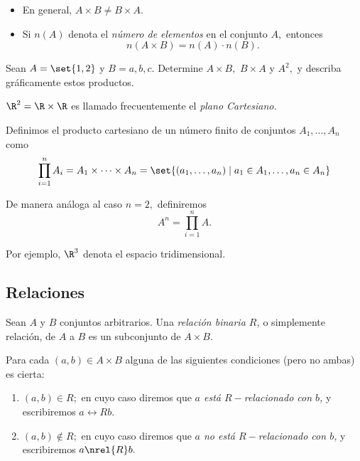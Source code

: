 	\begin{observacion}
		\begin{itemize}
			\item En general, $A\times B \neq B \times A.$
			\item Si \emph{$n(A)$} denota el \emph{número de elementos} en el conjunto $A,$ entonces
			$$
			n(A \times B)= n(A) \cdot n(B).
			$$
		\end{itemize}

	\end{observacion}





	Sean $A=\set{1,2}$ y $B={a,b,c}.$ Determine $A\times B,$ $B\times A$ y $A^{2},$ y describa gráficamente estos productos.



	\begin{problema}
		$\R^{2}=\R \times \R$ es llamado frecuentemente el \emph{plano Cartesiano.}
	\end{problema}




	\begin{definicion}
		Definimos el producto cartesiano de un número finito de conjuntos $A_{1},...,A_{n}$ como
		$$
		\prod_{i=1}^{n} A_{i}= A_{1} \times \cdots \times A_{n}=\set{\left( a_{1},\dots,a_{n} \right)\mid a_{1}\in A_{1}, \dots, a_{n}\in A_{n}}
		$$
	\end{definicion}




	\begin{observacion}
		De manera análoga al caso $n=2,$ definiremos
		$$
		A^{n}=\prod_{i=1}^{n}A.
		$$


		Por ejemplo, $\R^{3}$ denota el espacio tridimensional.
	\end{observacion}



\subsection{Relaciones}


	\begin{definicion}
		Sean $A$ y $B$ conjuntos arbitrarios. Una \emph{relación binaria $R$,} o simplemente relación, de $A$ a $B$ es un subconjunto de $A \times B.$
	\end{definicion}




	Para cada $(a,b)\in A \times B$ alguna de las siguientes condiciones (pero no ambas) es cierta:
	\begin{enumerate}
		\item $(a,b)\in R;$ en cuyo caso diremos que \emph{$a$ está $R-$relacionado con $b$,} y escribiremos $a \rel{R} b.$
		\item $(a,b)\not\in R;$ en cuyo caso diremos que \emph{$a$ no está $R-$relacionado con $b$,} y escribiremos $a \nrel{R} b.$
	\end{enumerate}




